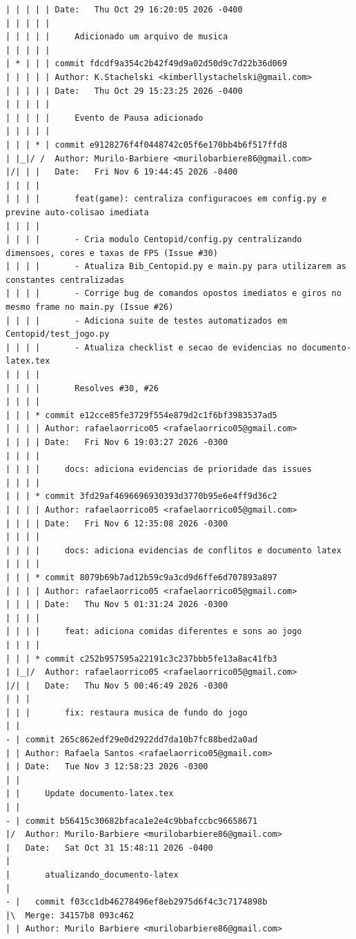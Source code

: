 \documentclass[12pt]{article}
\begin{document}
\begin{lstlisting}
| | | | | Date:   Thu Oct 29 16:20:05 2026 -0400
| | | | | 
| | | | |     Adicionado um arquivo de musica
| | | | | 
| * | | | commit fdcdf9a354c2b42f49d9a02d50d9c7d22b36d069
| | | | | Author: K.Stachelski <kimberllystachelski@gmail.com>
| | | | | Date:   Thu Oct 29 15:23:25 2026 -0400
| | | | | 
| | | | |     Evento de Pausa adicionado
| | | | | 
| | | * | commit e9128276f4f0448742c05f6e170bb4b6f517ffd8
| |_|/ /  Author: Murilo-Barbiere <murilobarbiere86@gmail.com>
|/| | |   Date:   Fri Nov 6 19:44:45 2026 -0400
| | | |   
| | | |       feat(game): centraliza configuracoes em config.py e previne auto-colisao imediata
| | | |       
| | | |       - Cria modulo Centopid/config.py centralizando dimensoes, cores e taxas de FPS (Issue #30)
| | | |       - Atualiza Bib_Centopid.py e main.py para utilizarem as constantes centralizadas
| | | |       - Corrige bug de comandos opostos imediatos e giros no mesmo frame no main.py (Issue #26)
| | | |       - Adiciona suite de testes automatizados em Centopid/test_jogo.py
| | | |       - Atualiza checklist e secao de evidencias no documento-latex.tex
| | | |       
| | | |       Resolves #30, #26
| | | | 
| | | * commit e12cce85fe3729f554e879d2c1f6bf3983537ad5
| | | | Author: rafaelaorrico05 <rafaelaorrico05@gmail.com>
| | | | Date:   Fri Nov 6 19:03:27 2026 -0300
| | | | 
| | | |     docs: adiciona evidencias de prioridade das issues
| | | | 
| | | * commit 3fd29af4696696930393d3770b95e6e4ff9d36c2
| | | | Author: rafaelaorrico05 <rafaelaorrico05@gmail.com>
| | | | Date:   Fri Nov 6 12:35:08 2026 -0300
| | | | 
| | | |     docs: adiciona evidencias de conflitos e documento latex
| | | | 
| | | * commit 8079b69b7ad12b59c9a3cd9d6ffe6d707893a897
| | | | Author: rafaelaorrico05 <rafaelaorrico05@gmail.com>
| | | | Date:   Thu Nov 5 01:31:24 2026 -0300
| | | | 
| | | |     feat: adiciona comidas diferentes e sons ao jogo
| | | | 
| | | * commit c252b957595a22191c3c237bbb5fe13a8ac41fb3
| |_|/  Author: rafaelaorrico05 <rafaelaorrico05@gmail.com>
|/| |   Date:   Thu Nov 5 00:46:49 2026 -0300
| | |   
| | |       fix: restaura musica de fundo do jogo
| | 
- | commit 265c862edf29e0d2922dd7da10b7fc88bed2a0ad
| | Author: Rafaela Santos <rafaelaorrico05@gmail.com>
| | Date:   Tue Nov 3 12:58:23 2026 -0300
| | 
| |     Update documento-latex.tex
| | 
- | commit b56415c30682bfaca1e2e4c9bbafccbc96658671
|/  Author: Murilo-Barbiere <murilobarbiere86@gmail.com>
|   Date:   Sat Oct 31 15:48:11 2026 -0400
|   
|       atualizando_documento-latex
|   
- |   commit f03cc1db46278496ef8eb2975d6f4c3c7174898b
|\  Merge: 34157b8 093c462
| | Author: Murilo Barbiere <murilobarbiere86@gmail.com>

\end{lstlisting}
\end{document}
